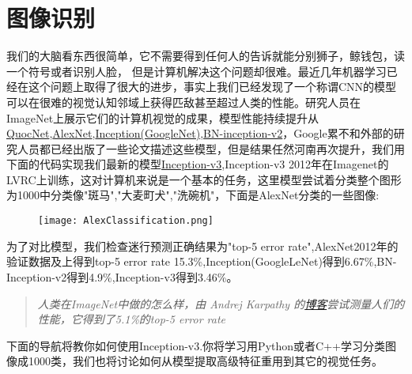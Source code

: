 \section{图像识别}
我们的大脑看东西很简单，它不需要得到任何人的告诉就能分别狮子，鲸钱包，读一个符号或者识别人脸，
但是计算机解决这个问题却很难。最近几年机器学习已经在这个问题上取得了很大的进步，事实上我们已经发现了一个称谓CNN的模型可以在很难的视觉认知邻域上获得匹敌甚至超过人类的性能。研究人员在ImageNet上展示它们的计算机视觉的成果，模型性能持续提升从\href{http://static.googleusercontent.com/media/research.google.com/en//archive/unsupervised_icml2012.pdf}{QuocNet},\href{http://www.cs.toronto.edu/~fritz/absps/imagenet.pdf}{AlexNet},\href{http://arxiv.org/abs/1409.4842}{Inception(GoogleNet)},\href{http://arxiv.org/abs/1502.03167}{BN-inception-v2}，Google累不和外部的研究人员都已经出版了一些论文描述这些模型，但是结果任然河南再次提升，我们用下面的代码实现我们最新的模型\href{http://arxiv.org/abs/1512.00567}{Inception-v3},Inception-v3 2012年在Imagenet的LVRC上训练，这对计算机来说是一个基本的任务，这里模型尝试着分类整个图形为1000中分类像"斑马","大麦町犬","洗碗机"，下面是AlexNet分类的一些图像:
\begin{center}
\begin{figure}[H]
\texttt{[image: AlexClassification.png]}
\end{figure}
\end{center}
为了对比模型，我们检查迷行预测正确结果为"top-5 error rate",AlexNet2012年的验证数据及上得到top-5 error rate 15.3\%,Inception(GoogleLeNet)得到6.67\%,BN-Inception-v2得到4.9\%,Inception-v3得到3.46\%。
\begin{quote}
\emph{人类在ImageNet中做的怎么样，由 Andrej Karpathy 的\href{http://karpathy.github.io/2014/09/02/what-i-learned-from-competing-against-a-convnet-on-imagenet/}{博客}尝试测量人们的性能，它得到了5.1\%的top-5 error rate}
\end{quote}
下面的导航将教你如何使用Inception-v3.你将学习用Python或者C++学习分类图像成1000类，我们也将讨论如何从模型提取高级特征重用到其它的视觉任务。

